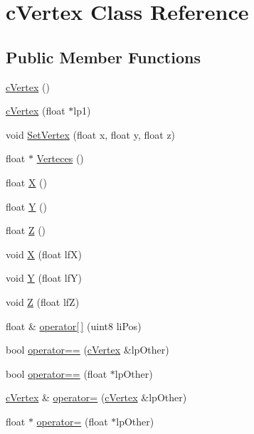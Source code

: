 \hypertarget{classc_vertex}{
\section{cVertex Class Reference}
\label{classc_vertex}
}
\subsection*{Public Member Functions}
\begin{DoxyCompactItemize}
\item 
\hyperlink{classc_vertex_a77445b43522243e1744595b186161c97}{cVertex} ()
\item 
\hyperlink{classc_vertex_a5fb10e412c25e1f2c2b7dac129cb4846}{cVertex} (float $\ast$lp1)
\item 
void \hyperlink{classc_vertex_a243d08649d210996e5b3cf66890e52dc}{SetVertex} (float x, float y, float z)
\item 
float $\ast$ \hyperlink{classc_vertex_ad24ae23b5726d9aa72ccdbbff5a3a81b}{Verteces} ()
\item 
float \hyperlink{classc_vertex_abe7b47f49c2e78cd1dc155b8699094aa}{X} ()
\item 
float \hyperlink{classc_vertex_aebcfec9110f2ad904626a4c2ba959408}{Y} ()
\item 
float \hyperlink{classc_vertex_ad8e0a8ceb0b11663eda3d864cd45773c}{Z} ()
\item 
void \hyperlink{classc_vertex_a59e6a759ac7e63dd393bf28908219638}{X} (float lfX)
\item 
void \hyperlink{classc_vertex_ae3c93279184e7222a036be3f17bc4d53}{Y} (float lfY)
\item 
void \hyperlink{classc_vertex_ae46254a1259502872bea361839f6847b}{Z} (float lfZ)
\item 
float \& \hyperlink{classc_vertex_ac006ad15a7ccfbfa3bcf0d40026b205a}{operator\mbox{[}$\,$\mbox{]}} (uint8 liPos)
\item 
bool \hyperlink{classc_vertex_ac57e24b66c9175e40dd1cbcf6e0488b0}{operator==} (\hyperlink{classc_vertex}{cVertex} \&lpOther)
\item 
bool \hyperlink{classc_vertex_a7a04d0565045f4c35db3580c2f8a96d5}{operator==} (float $\ast$lpOther)
\item 
\hyperlink{classc_vertex}{cVertex} \& \hyperlink{classc_vertex_af3dd1bd25885847f183e28aeca7fc8bc}{operator=} (\hyperlink{classc_vertex}{cVertex} \&lpOther)
\item 
float $\ast$ \hyperlink{classc_vertex_a44e59c236e07e423eeabb24ea4aa7d40}{operator=} (float $\ast$lpOther)

\end{DoxyCompactItemize}
